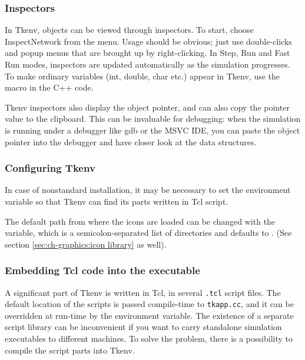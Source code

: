 \subsubsection{Inspectors}


In Tkenv, objects can be viewed through inspectors. To start, choose
Inspect{\textbar}Network from the menu. Usage should be obvious; just
use double-clicks and popup menus that are brought up by
right-clicking. In Step, Run and Fast Run modes, inspectors are
updated automatically as the simulation progresses. To make ordinary
variables (int, double, char etc.) appear in Tkenv, use the
 macro in the C++ code.

Tkenv inspectors also display the object pointer, and can also copy
the pointer value to the clipboard. This can be invaluable for debugging:
when the simulation is running under a debugger like gdb or the MSVC IDE,
you can paste the object pointer into the debugger and have closer look
at the data structures.


\subsubsection{Configuring Tkenv}


In case of nonstandard installation, it may be necessary to set the
 environment variable so that Tkenv can find
its parts written in Tcl script.

The default path from where the icons are loaded can be changed with
the  variable, which is a
semicolon-separated list of directories and defaults to
. (See section
\ref{sec:ch-graphics:icon library} as well).



\subsubsection{Embedding Tcl code into the executable}

A significant part of Tkenv is written in Tcl, in several
\texttt{.tcl} script files. The default location of the scripts is
passed compile-time to \texttt{tkapp.cc}, and it can be overridden at
run-time by the  environment variable. The
existence of a separate script library can be inconvenient if you want
to carry standalone simulation executables to different machines. To
solve the problem, there is a possibility to compile the script parts
into Tkenv.

